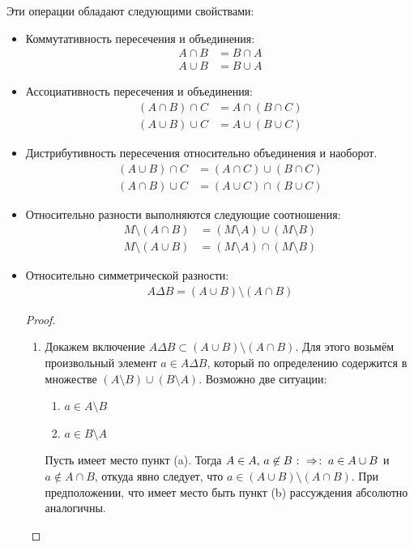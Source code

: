 Эти операции обладают следующими свойствами:

\begin{itemize}
	\item Коммутативность пересечения и объединения:
		\begin{align*}
			A\cap B&=B\cap A \\
			A\cup B&=B\cup A
		\end{align*}
	\item Ассоциативность пересечения и объединения:
		\begin{align*}
			(A\cap B)\cap C&=A\cap(B\cap C) \\
			(A\cup B)\cup C&=A\cup(B\cup C)
		\end{align*}
	\item Дистрибутивность пересечения относительно объединения и наоборот.
		\begin{align*}
			(A\cup B)\cap C&=(A\cap C)\cup(B\cap C) \\
			(A\cap B)\cup C&=(A\cup C)\cap(B\cup C)
		\end{align*}
	\item Относительно разности выполняются следующие соотношения:
		\begin{align*}
			M\setminus(A\cap B)&=(M\setminus A)\cup(M\setminus B) \\
			M\setminus(A\cup B)&=(M\setminus A)\cap(M\setminus B)
		\end{align*}
	\item Относительно симметрической разности:
          \begin{align*}
            A\Delta B = (A\cup B)\setminus (A\cap B)
          \end{align*}
    \begin{proof}\par\strut\\
    \begin{enumerate}
      \item Докажем включение $A\Delta B \subset (A\cup B)\setminus (A\cap B)$. 
        Для этого возьмём произвольный элемент $a\in A\Delta B$,
        который по определению содержится в множестве $(A\setminus B)\cup(B\setminus A)$. 
        Возможно две ситуации:
        \begin{enumerate}
          \item $a\in A\setminus B$
          \item $a\in B\setminus A$
        \end{enumerate}
        Пусть имеет место пункт (a).
        Тогда $A\in A,\, a\not\in B\mathbin{\colon\Rightarrow \colon} a \in A\cup B$ и $a\not\in A\cap B$, откуда явно следует, 
        что $a\in(A\cup B)\setminus (A\cap B)$. При предположении, что имеет место быть 
        пункт (b) рассуждения абсолютно аналогичны.
      

\end{enumerate}
\end{proof}
\end{itemize}
